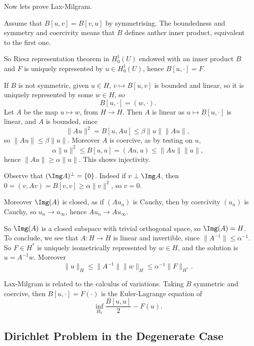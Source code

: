 \documentclass[12pt]{article}
\begin{document}
Now lets prove Lax-Milgram.

\begin{proofbox}
	Assume that $B[u, v] = B[v, u]$ by symmetrising. The boundedness and symmetry and coercivity means that $B$ defines anther inner product, equivalent to the first one.

	So Riesz representation theorem in $H^1_0(U)$ endowed with an inner product $B$ and $F$ is uniquely represented by $u \in H^1_0(U)$, hence $B[u, \cdot] = F$.

	If $B$ is not symmetric, given $u \in H$, $v \mapsto B[u, v]$ is bounded and linear, so it is uniquely represented by some $w \in H$, so 
	\[
		B[u, \cdot] = (w, \cdot).
	\]
	Let $A$ be the map $u \mapsto w$, from $H \to H$. Then $A$ is linear as $u \mapsto B[u, \cdot]$ is linear, and $A$ is bounded, since
	\[
		\|Au\|^2 = B[u, Au] \leq \beta \|u\| \|A u\|,
	\]
	so $\|A u\| \leq \beta \|u\|$. Moreover $A$ is coercive, as by testing on $u$,
	\[
		\alpha \|u\|^2 \leq B[u, u] = (Au, u) \leq \|Au\| \|u\|,
	\]
	hence $\|Au\| \geq \alpha \|u\|$. This shows injectivity.

	Observe that $(\Img A)^{\perp} = \{0\}$. Indeed if $v \perp \Img A$, then $0 = (v, Av) = B[v, v] \geq \alpha \|v\|^2$, so $v = 0$.

	Moreover $\Img (A)$ is closed, as if $(A u_n)$ is Cauchy, then by coercivity $(u_n)$ is Cauchy, so $u_n \to u_\infty$, hence $A u_n \to A u_{\infty}$.

	So $\Img (A)$ is a closed subspace with trivial orthogonal space, so $\Img (A) = H$. To conclude, we see that $A : H \to H$ is linear and invertible, since $\|A^{-1}\| \leq \alpha^{-1}$. So $F \in H^{\ast}$ is uniquely isometrically represented by $w \in H$, and the solution is $u = A^{-1}w$. Moreover
	\[
	\|u\|_H \leq \|A^{-1}\| \|w\|_H \leq \alpha^{-1} \|F\|_{H^{\ast}}.
	\]
\end{proofbox}

\begin{remark}
	Lax-Milgram is related to the calculus of variations. Taking $B$ symmetric and coercive, then $B[u, \cdot] = F(\cdot)$ is the Euler-Lagrange equation of
	\[
		\inf_{H_0} \frac{B[u, u]}{2} - F(u).
	\]
\end{remark}

\subsection{Dirichlet Problem in the Degenerate Case}%
\label{sub:dir_deg}
\end{document}
